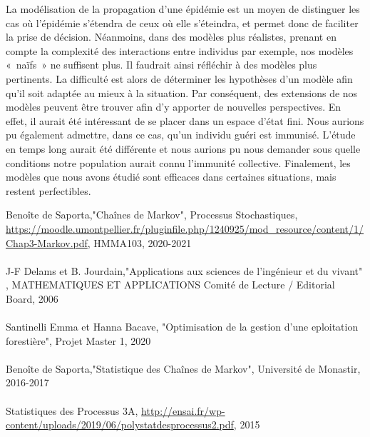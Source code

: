 \documentclass[12pt,a4paper]{report}
\theoremstyle{remark}
\begin{document}
La modélisation de la propagation d’une épidémie est un moyen de distinguer les cas où l’épidémie s’étendra de ceux où elle s’éteindra, et permet donc de faciliter la prise de décision. Néanmoins, dans des modèles plus réalistes, prenant en compte la complexité des interactions entre individus par exemple, nos modèles « naïfs » ne suffisent plus. Il faudrait ainsi réfléchir à des modèles plus pertinents. La difficulté est alors de déterminer les hypothèses d’un modèle afin qu’il soit adaptée au mieux à la situation. Par conséquent, des extensions de nos modèles peuvent être trouver afin d’y apporter de nouvelles perspectives. En effet, il aurait été intéressant de se placer dans un espace d’état fini. Nous aurions pu également admettre, dans ce cas, qu’un individu guéri est immunisé. L’étude en temps long aurait été différente et nous aurions pu nous demander sous quelle conditions notre population aurait connu l’immunité collective. Finalement, les modèles que nous avons étudié sont efficaces dans certaines situations, mais restent perfectibles.











\begin{thebibliography}{8} 
 Benoîte de Saporta,{"Chaînes de Markov",  Processus Stochastiques, \url{https://moodle.umontpellier.fr/pluginfile.php/1240925/mod_resource/content/1/Chap3-Markov.pdf}, HMMA103, 2020-2021}
\\
\\
 J-F Delams et B. Jourdain,{"Applications aux sciences de l'ingénieur et du vivant" , MATHEMATIQUES ET APPLICATIONS Comité de Lecture / Editorial Board, 2006 } 
\\
\\
 Santinelli Emma et Hanna Bacave, {"Optimisation de la gestion d'une eploitation forestière", Projet Master 1, 2020}
\\
\\
 Benoîte de Saporta,{"Statistique des Chaînes de Markov",  Université de Monastir, 2016-2017} 
\\
\\
 Statistiques des Processus 3A, {\url{http://ensai.fr/wp-content/uploads/2019/06/polystatdesprocessus2.pdf}, 2015}
\end{thebibliography}
\end{document}
